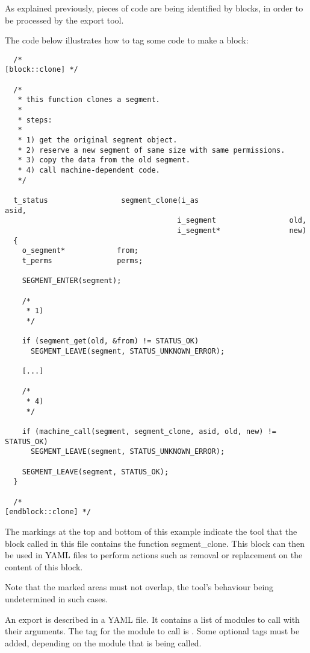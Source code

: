 

As explained previously, pieces of code are being identified by blocks, in
order to be processed by the export tool.

The code below illustrates how to tag some code to make a block:

\begin{verbatim}
  /*                                                          [block::clone] */

  /*
   * this function clones a segment.
   *
   * steps:
   *
   * 1) get the original segment object.
   * 2) reserve a new segment of same size with same permissions.
   * 3) copy the data from the old segment.
   * 4) call machine-dependent code.
   */

  t_status                 segment_clone(i_as                      asid,
                                        i_segment                 old,
                                        i_segment*                new)
  {
    o_segment*            from;
    t_perms               perms;

    SEGMENT_ENTER(segment);

    /*
     * 1)
     */

    if (segment_get(old, &from) != STATUS_OK)
      SEGMENT_LEAVE(segment, STATUS_UNKNOWN_ERROR);

    [...]

    /*
     * 4)
     */

    if (machine_call(segment, segment_clone, asid, old, new) != STATUS_OK)
      SEGMENT_LEAVE(segment, STATUS_UNKNOWN_ERROR);

    SEGMENT_LEAVE(segment, STATUS_OK);
  }

  /*                                                       [endblock::clone] */
\end{verbatim}

The markings at the top  and bottom  of this
example indicate the  tool that the block called  in this file
contains the function segment\_clone. This block can then be used in YAML files to perform
actions such as removal or replacement on the content of this block.

Note that the marked areas must not overlap, the  tool's
behaviour being undetermined in such cases.

An export is described in a YAML file. It contains a list of modules to call with their arguments. The tag for the module to call is . Some optional tags must be added, depending on the module that is being called.


